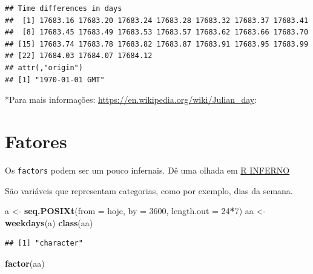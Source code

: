 \documentclass[]{book}
\newenvironment{Shaded}{\begin{snugshade}}{\end{snugshade}}
\newcommand{\KeywordTok}[1]{\textcolor[rgb]{0.13,0.29,0.53}{\textbf{#1}}}
\newcommand{\DataTypeTok}[1]{\textcolor[rgb]{0.13,0.29,0.53}{#1}}
\newcommand{\DecValTok}[1]{\textcolor[rgb]{0.00,0.00,0.81}{#1}}
\newcommand{\StringTok}[1]{\textcolor[rgb]{0.31,0.60,0.02}{#1}}
\newcommand{\OperatorTok}[1]{\textcolor[rgb]{0.81,0.36,0.00}{\textbf{#1}}}
\newcommand{\NormalTok}[1]{#1}
\theoremstyle{definition}
\theoremstyle{definition}
\theoremstyle{definition}
\theoremstyle{remark}
\begin{document}
\begin{verbatim}
## Time differences in days
##  [1] 17683.16 17683.20 17683.24 17683.28 17683.32 17683.37 17683.41
##  [8] 17683.45 17683.49 17683.53 17683.57 17683.62 17683.66 17683.70
## [15] 17683.74 17683.78 17683.82 17683.87 17683.91 17683.95 17683.99
## [22] 17684.03 17684.07 17684.12
## attr(,"origin")
## [1] "1970-01-01 GMT"
\end{verbatim}

*Para mais informações: \url{https://en.wikipedia.org/wiki/Julian_day}:

\section{Fatores}\label{fatores}

Os \texttt{factors} podem ser um pouco infernais. Dê uma olhada em
\href{http://www.burns-stat.com/documents/books/the-r-inferno/}{R
INFERNO}

São variáveis que representam categorias, como por exemplo, dias da
semana.

\begin{Shaded}
\begin{Highlighting}[]
\NormalTok{a <-}\StringTok{ }\KeywordTok{seq.POSIXt}\NormalTok{(}\DataTypeTok{from =}\NormalTok{ hoje, }\DataTypeTok{by =} \DecValTok{3600}\NormalTok{, }\DataTypeTok{length.out =} \DecValTok{24}\OperatorTok{*}\DecValTok{7}\NormalTok{)}
\NormalTok{aa <-}\StringTok{ }\KeywordTok{weekdays}\NormalTok{(a)}
\KeywordTok{class}\NormalTok{(aa)}
\end{Highlighting}
\end{Shaded}

\begin{verbatim}
## [1] "character"
\end{verbatim}

\begin{Shaded}
\begin{Highlighting}[]
\KeywordTok{factor}\NormalTok{(aa)}
\end{Highlighting}
\end{Shaded}
\end{document}
